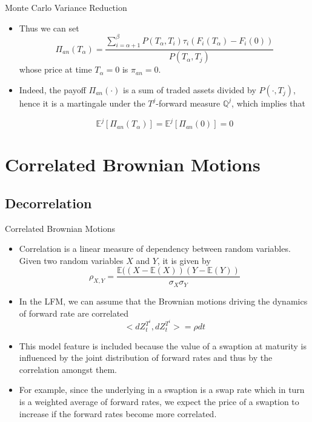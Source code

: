 \documentclass{beamer}
\begin{document}
\begin{frame}{Monte Carlo Variance Reduction}
  \begin{itemize}
  \item<1-> Thus we can set
    \begin{equation*}
      \Pi_{an}(T_\alpha) = \frac{\sum_{i=\alpha+1}^\beta P(T_\alpha,T_i)\tau_i(F_i(T_\alpha) - F_i(0))}{P(T_\alpha,T_j)}
    \end{equation*}
    whose price at time $T_\alpha = 0$ is $\pi_{an} = 0$.
  \item<2-> Indeed, the payoff $\Pi_{an}(\cdot)$ is a sum of traded assets divided by $P(\cdot, T_j)$, hence it is a martingale under the $T^j$-forward measure $\mathbb{Q}^j$, which implies that
    
    \begin{equation*}
      \mathbb{E}^j[\Pi_{an}(T_\alpha)] = \mathbb{E}^j[\Pi_{an}(0)] = 0
    \end{equation*}
  \end{itemize}
\end{frame}

\section{Correlated Brownian Motions}
\subsection{Decorrelation}
\begin{frame}{Correlated Brownian Motions}
  \begin{itemize}
  \item<1-> Correlation is a linear measure of dependency between random variables. Given two random variables $X$ and $Y$, it is given by
  	\begin{equation*}
  		\rho_{X,Y} = \frac{\mathbb{E}((X-\mathbb{E}(X))(Y-\mathbb{E}(Y))}{\sigma_X \sigma_Y}
  	\end{equation*}
  \item<2-> In the LFM, we can assume that the Brownian motions driving the dynamics of forward rate are correlated
    \begin{equation*}
      <dZ_t^{T^i}, dZ_t^{T^i}> = \rho dt
    \end{equation*}
  \item<3-> This model feature is included because the value of a swaption at maturity is influenced by the joint distribution of forward rates and thus by the correlation amongst them. 
  \item<4-> For example, since the underlying in a swaption is a swap rate which in turn is a weighted average of forward rates, we expect the price of a swaption to increase if the forward rates become more correlated. 
  \end{itemize}
\end{frame}
\end{document}
